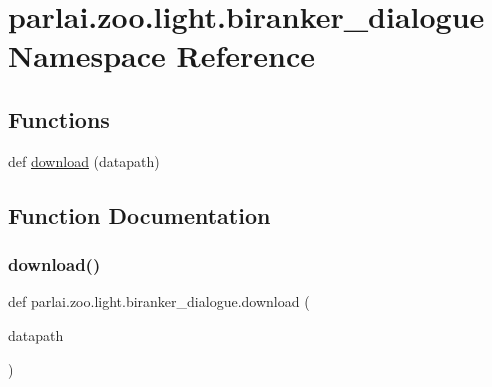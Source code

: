 \hypertarget{namespaceparlai_1_1zoo_1_1light_1_1biranker__dialogue}{}\section{parlai.\+zoo.\+light.\+biranker\+\_\+dialogue Namespace Reference}
\label{namespaceparlai_1_1zoo_1_1light_1_1biranker__dialogue}
\subsection*{Functions}
\begin{DoxyCompactItemize}
\item 
def \hyperlink{namespaceparlai_1_1zoo_1_1light_1_1biranker__dialogue_a05cb4ae259c43c98f9def9a34b97316a}{download} (datapath)
\end{DoxyCompactItemize}


\subsection{Function Documentation}
\mbox{\label{namespaceparlai_1_1zoo_1_1light_1_1biranker__dialogue_a05cb4ae259c43c98f9def9a34b97316a}} 
\subsubsection{\texorpdfstring{download()}{download()}}
{\footnotesize\ttfamily def parlai.\+zoo.\+light.\+biranker\+\_\+dialogue.\+download (\begin{DoxyParamCaption}\item[{}]{datapath }\end{DoxyParamCaption})}


